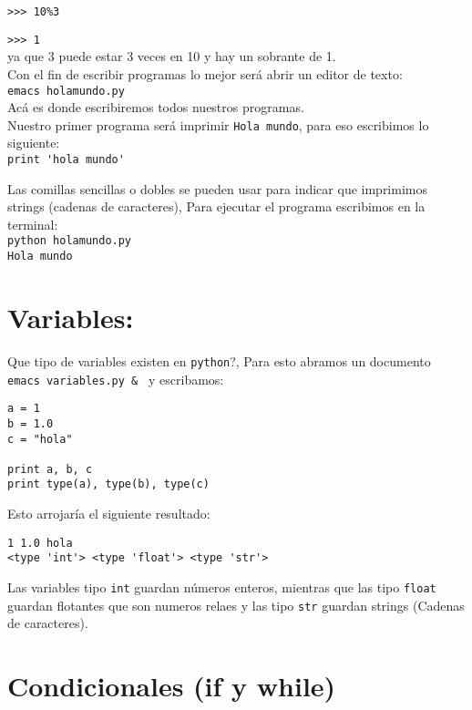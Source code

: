 \documentclass[12pt]{article}
\begin{document}
\verb">>> 10%3"

\verb">>> 1" \\

ya que 3 puede estar 3 veces en 10 y hay un sobrante de 1.\\

Con el fin de escribir programas lo mejor ser\'a abrir un editor de texto:\\

\verb"emacs holamundo.py"\\

Ac\'a es donde escribiremos todos nuestros programas.\\

Nuestro primer programa ser\'a imprimir \verb"Hola mundo", para eso escribimos lo siguiente:\\

\verb"print 'hola mundo'"

Las comillas sencillas o dobles se pueden usar para indicar que imprimimos strings (cadenas de caracteres),
Para ejecutar el programa escribimos en la terminal:\\

\verb"python holamundo.py"\\
\verb"Hola mundo"

\section{Variables:}

Que tipo de variables existen en \verb+python+?, Para esto abramos un documento \verb"emacs variables.py & " y escribamos:

\begin{verbatim}
a = 1
b = 1.0
c = "hola"

print a, b, c
print type(a), type(b), type(c)
\end{verbatim}

Esto arrojar\'ia el siguiente resultado:

\begin{verbatim}
1 1.0 hola
<type 'int'> <type 'float'> <type 'str'>
\end{verbatim}

Las variables tipo \verb"int" guardan n\'umeros enteros, mientras que las tipo \verb"float" guardan flotantes que son numeros relaes y 
las tipo \verb"str" guardan strings (Cadenas de caracteres).

\section{Condicionales (if y while)}
\end{document}

